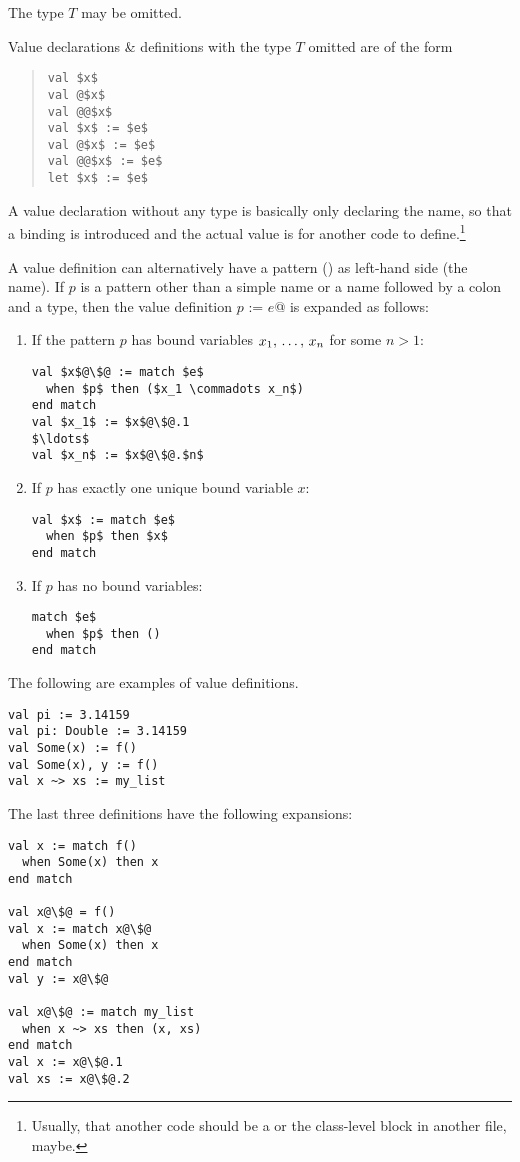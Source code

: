 The type $T$ may be omitted. 

Value declarations \& definitions with the type $T$ omitted are of the form
\begin{quote}\begin{lstlisting}
val $x$
val @$x$
val @@$x$
val $x$ := $e$
val @$x$ := $e$
val @@$x$ := $e$
let $x$ := $e$
\end{lstlisting}\end{quote}

A value declaration without any type is basically only declaring the name, so that a binding is introduced and the actual value is for another code to define.\footnote{Usually, that another code should be a  or the class-level block in another file, maybe.}

A value definition can alternatively have a pattern () as left-hand side (the name). If $p$ is a pattern other than a simple name or a name followed by a colon and a type, then the value definition \lstinline@val $p$ := $e$@ is expanded as follows: 

\begin{enumerate}
\item
If the pattern $p$ has bound variables $x_1 ,\, \ldots ,\, x_n$ for some $n > 1$:
\begin{lstlisting}[escapechar=@]
val $x$@\$@ := match $e$
  when $p$ then ($x_1 \commadots x_n$)
end match
val $x_1$ := $x$@\$@.1
$\ldots$
val $x_n$ := $x$@\$@.$n$
\end{lstlisting}

\item
If $p$ has exactly one unique bound variable $x$:
\begin{lstlisting}
val $x$ := match $e$
  when $p$ then $x$
end match
\end{lstlisting}

\item
If $p$ has no bound variables:
\begin{lstlisting}
match $e$
  when $p$ then ()
end match
\end{lstlisting}
\end{enumerate}

\example The following are examples of value definitions. 
\begin{lstlisting}
val pi := 3.14159
val pi: Double := 3.14159
val Some(x) := f() 
val Some(x), y := f()
val x ~> xs := my_list
\end{lstlisting}

The last three definitions have the following expansions:
\begin{lstlisting}[escapechar=@]
val x := match f()
  when Some(x) then x
end match

val x@\$@ = f()
val x := match x@\$@
  when Some(x) then x
end match
val y := x@\$@

val x@\$@ := match my_list
  when x ~> xs then (x, xs)
end match
val x := x@\$@.1
val xs := x@\$@.2
\end{lstlisting}

